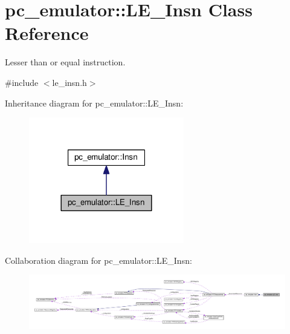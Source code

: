 \hypertarget{classpc__emulator_1_1LE__Insn}{}\section{pc\+\_\+emulator\+:\+:L\+E\+\_\+\+Insn Class Reference}
\label{classpc__emulator_1_1LE__Insn}


Lesser than or equal instruction.  




{\ttfamily \#include $<$le\+\_\+insn.\+h$>$}



Inheritance diagram for pc\+\_\+emulator\+:\+:L\+E\+\_\+\+Insn\+:
\nopagebreak
\begin{figure}[H]
\begin{center}
\leavevmode
\includegraphics[width=192pt]{classpc__emulator_1_1LE__Insn__inherit__graph}
\end{center}
\end{figure}


Collaboration diagram for pc\+\_\+emulator\+:\+:L\+E\+\_\+\+Insn\+:
\nopagebreak
\begin{figure}[H]
\begin{center}
\leavevmode
\includegraphics[width=350pt]{classpc__emulator_1_1LE__Insn__coll__graph}
\end{center}
\end{figure}
